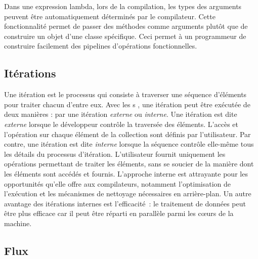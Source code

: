 Dans une expression lambda, lors de la compilation, les types des arguments peuvent \^etre automatiquement d\'etermin\'es par le compilateur. Cette fonctionnalit\'e permet de passer des m\'ethodes comme arguments plut\^ot que de construire un objet d'une classe sp\'ecifique. Ceci permet \`a un programmeur de construire facilement des pipelines d'op\'erations fonctionnelles.


\subsection{It\'erations}

Une it\'eration est le processus qui consiste \`a traverser une s\'equence d'\'el\'ements pour traiter chacun d'entre eux. Avec les s , une it\'eration peut \^etre ex\'ecut\'ee de deux mani\`eres : par une it\'eration \emph{externe} ou \emph{interne}. Une it\'eration est dite \emph{externe} lorsque le d\'eveloppeur contr\^ole la travers\'ee des \'el\'ements.  L'acc\`es et l'op\'eration sur chaque \'el\'ement de la collection sont d\'efinis par l'utilisateur. Par contre, une it\'eration est dite \emph{interne} lorsque la s\'equence contr\^ole elle-m\^eme tous les d\'etails du processus d'it\'eration. L'utilisateur fournit uniquement les op\'erations permettant de traiter les \'el\'ements, sans se soucier de la mani\`ere dont les \'el\'ements sont acc\'ed\'es et fournis.
L'approche interne est attrayante pour les opportunit\'es qu'elle offre aux compilateurs, notamment l'optimisation de l'exécution et les m\'ecanismes de nettoyage n\'ecessaires en arri\`ere-plan. Un autre avantage des it\'erations internes est l'efficacit\'e~: le traitement de donn\'ees peut \^etre plus efficace car il peut \^etre r\'eparti en parall\`ele parmi les cœurs de la machine.



\subsection{Flux}


